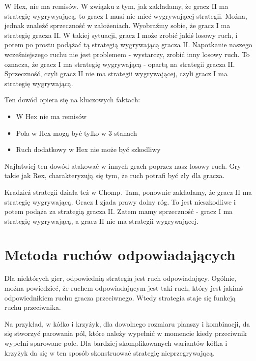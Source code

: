 \documentclass{../notatki}
\begin{document}
\begin{examplebox}
  W Hex, nie ma remisów. W związku z tym, jak zakładamy, że gracz II
  ma strategię
  wygrywyającą, to gracz I musi nie mieć wygrywającej strategii. Można, jednak
  znaleźć sprzeczność w założeniach. Wyobraźmy sobie, że gracz I ma strategię
  gracza II. W takiej sytuacji, gracz I może zrobić jakiś losowy ruch, i potem
  po prostu podążać tą strategią wygrywającą gracza II. Napotkanie naszego
  wcześniejszego ruchu nie jest problemem - wystarczy, zrobić inny losowy ruch.
  To oznacza, że gracz I ma strategię wygrywającą - opartą na strategii gracza
  II. Sprzeczność, czyli gracz II nie ma strategii wygrywającej, czyli gracz I
  ma strategię wygrywającą.

  Ten dowód opiera się na kluczowych faktach:
  \begin{itemize}
    \item W Hex nie ma remisów
    \item Pola w Hex mogą być tylko w 3 stanach
    \item Ruch dodatkowy w Hex nie może być szkodliwy
  \end{itemize}

\end{examplebox}

Najłatwiej ten dowód atakować w innych grach poprzez nasz losowy
ruch. Gry takie
jak Rex, charakteryzują się tym, że ruch potrafi być zły dla
gracza.

Kradzież strategii działa też w Chomp. Tam, ponownie zakładamy, że gracz II
ma strategię wygrywającą. Gracz I zjada prawy dolny róg. To jest nieszkodliwe
i potem podąża za strategią gracza II. Zatem mamy sprzeczność - gracz I ma
strategię wygrywającą, a gracz II nie ma strategii wygrywającej.

\section{Metoda ruchów odpowiadających}

Dla niektórych gier, odpowiednią strategią jest ruch odpowiadający. Ogólnie,
można powiedzieć, że ruchem odpowiadającym jest taki ruch, który jest jakimś
odpowiednikiem ruchu gracza przeciwnego. Wtedy strategia staje się funkcją
ruchu przeciwnika.

Na przykład, w kółko i krzyżyk, dla dowolnego rozmiaru planszy i kombinacji,
da się stworzyć parowania pól, które należy wypełnić w momencie kiedy przeciwnik
wypełni sparowane pole. Dla bardziej skomplikowanych wariantów kółka i krzyżyk
da się w ten sposób skonstruować strategię nieprzegrywającą.
\end{document}
